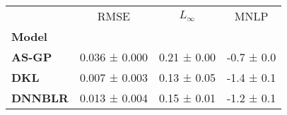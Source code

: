 \begin{tabular}{lccc}
\toprule
{} &           RMSE &   $L_\infty$ &        MNLP \\
\textbf{Model } &                &              &             \\
\midrule
\textbf{AS-GP } &  0.036 ± 0.000 &  0.21 ± 0.00 &  -0.7 ± 0.0 \\
\textbf{DKL   } &  0.007 ± 0.003 &  0.13 ± 0.05 &  -1.4 ± 0.1 \\
\textbf{DNNBLR} &  0.013 ± 0.004 &  0.15 ± 0.01 &  -1.2 ± 0.1 \\
\bottomrule
\end{tabular}
